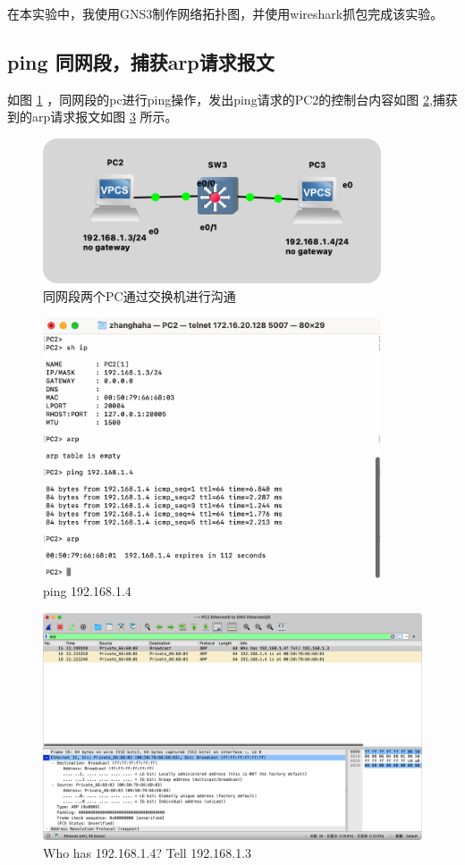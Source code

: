 \documentclass[a4paper,12pt]{report}
\begin{document}
\begin{spacing}{1.5}
在本实验中，我使用GNS3制作网络拓扑图，并使用wireshark抓包完成该实验。

\subsection{ping 同网段，捕获arp请求报文}
如图 \ref{pic8} ，同网段的pc进行ping操作，发出ping请求的PC2的控制台内容如图 \ref{pic9},捕获到的arp请求报文如图 \ref{pic10} 所示。

\begin{figure}[h!]
  \centering
\includegraphics[width=10cm]{figure/tongtuopu.png}
\caption{同网段两个PC通过交换机进行沟通}
\label{pic8}
\end{figure}
\begin{figure}[h!]
  \centering
\includegraphics[width=10cm]{figure/pc2.png}
\caption{ping 192.168.1.4}
\label{pic9}
\end{figure}
\begin{figure}[h!]
  \centering
\includegraphics[width=12cm]{figure/arpwho.png}
\caption{Who has 192.168.1.4? Tell 192.168.1.3}
\label{pic10}
\end{figure}


\end{spacing}
\end{document}
